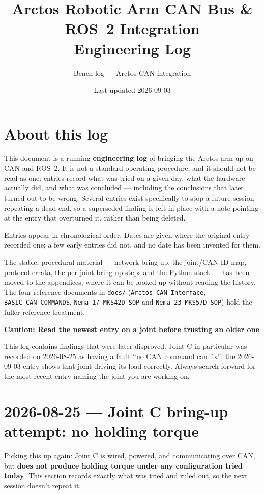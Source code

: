 \documentclass[11pt,letterpaper]{article}
\title{Arctos Robotic Arm CAN Bus \& ROS~2 Integration \\ \large Engineering Log}
\author{Bench log --- Arctos CAN integration}
\date{Last updated 2026-09-03}
\newenvironment{caution}[1]{%
    \par\addvspace{8pt}%
    \noindent{\color{cautionred}\rule{\linewidth}{0.8pt}}\par\vspace{2pt}
    \noindent\textbf{\color{cautionred}Caution: #1}\par\vspace{2pt}
}{%
    \par\vspace{2pt}\noindent{\color{cautionred}\rule{\linewidth}{0.4pt}}%
    \par\addvspace{8pt}%
}
\begin{document}
\maketitle
\tableofcontents
\newpage

\section*{About this log}
This document is a running \textbf{engineering log} of bringing the Arctos arm up
on CAN and ROS~2. It is not a standard operating procedure, and it should not be
read as one: entries record what was tried on a given day, what the hardware
actually did, and what was concluded --- including the conclusions that later
turned out to be wrong. Several entries exist specifically to stop a future
session repeating a dead end, so a superseded finding is left in place with a
note pointing at the entry that overturned it, rather than being deleted.

Entries appear in chronological order. Dates are given where the original entry
recorded one; a few early entries did not, and no date has been invented for
them.

The stable, procedural material --- network bring-up, the joint/CAN-ID map,
protocol errata, the per-joint bring-up steps and the Python stack --- has been
moved to the appendices, where it can be looked up without reading the history.
The four reference documents in \texttt{docs/} (\texttt{Arctos\_CAN\_Interface},
\texttt{BASIC\_CAN\_COMMANDS}, \texttt{Nema\_17\_MKS42D\_SOP} and
\texttt{Nema\_23\_MKS57D\_SOP}) hold the fuller reference treatment.

\begin{caution}{Read the newest entry on a joint before trusting an older one}
This log contains findings that were later disproved. Joint C in particular was
recorded on 2026-08-25 as having a fault ``no CAN command can fix''; the
2026-09-03 entry shows that joint driving its load correctly. Always search
forward for the most recent entry naming the joint you are working on.
\end{caution}

\newpage

\section{2026-08-25 --- Joint C bring-up attempt: no holding torque}
\label{sec:session-2026-08-25}
Picking this up again: Joint C is wired, powered, and communicating over CAN, but \textbf{does not produce holding torque under any configuration tried today}. This section records exactly what was tried and ruled out, so the next session doesn't repeat it.
\end{document}
